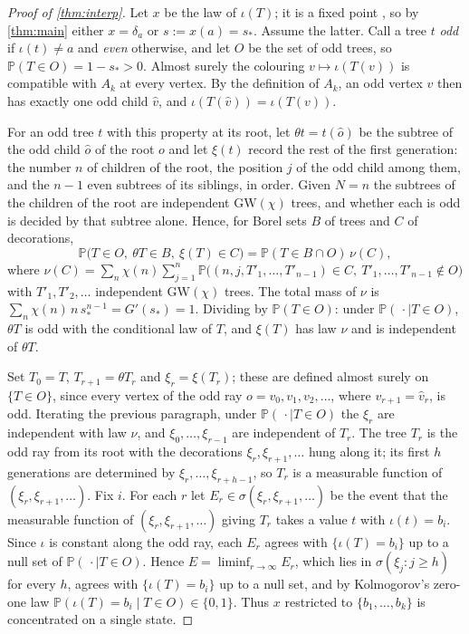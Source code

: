 \documentclass[11pt]{amsart}
\theoremstyle{remark}
\newcommand{\GW}{\mathrm{GW}}
\begin{document}
\begin{proof}[Proof of \cref{thm:interp}]
Let $x$ be the law of $\iota(T)$; it is a fixed point \cite[Section~1.5]{JPS}, so by \cref{thm:main} either $x=\delta_a$ or $s:=x(a)=s_*$. Assume the latter. Call a tree $t$ \emph{odd} if $\iota(t)\ne a$ and \emph{even} otherwise, and let $O$ be the set of odd trees, so $\mathbb P(T\in O)=1-s_*>0$. Almost surely the colouring $v\mapsto\iota(T(v))$ is compatible with $A_k$ at every vertex. By the definition of $A_k$, an odd vertex $v$ then has exactly one odd child $\hat v$, and $\iota(T(\hat v))=\iota(T(v))$.

For an odd tree $t$ with this property at its root, let $\theta t=t(\hat o)$ be the subtree of the odd child $\hat o$ of the root $o$ and let $\xi(t)$ record the rest of the first generation: the number $n$ of children of the root, the position $j$ of the odd child among them, and the $n-1$ even subtrees of its siblings, in order. Given $N=n$ the subtrees of the children of the root are independent $\GW(\chi)$ trees, and whether each is odd is decided by that subtree alone. Hence, for Borel sets $B$ of trees and $C$ of decorations,
\[
\mathbb P\bigl(T\in O,\ \theta T\in B,\ \xi(T)\in C\bigr)=\mathbb P(T\in B\cap O)\,\nu(C),
\]
where $\nu(C)=\sum_n\chi(n)\sum_{j=1}^{n}\mathbb P\bigl((n,j,T'_1,\dots,T'_{n-1})\in C,\ T'_1,\dots,T'_{n-1}\notin O\bigr)$ with $T'_1,T'_2,\dots$ independent $\GW(\chi)$ trees. The total mass of $\nu$ is $\sum_n\chi(n)\,n\,s_*^{n-1}=G'(s_*)=1$. Dividing by $\mathbb P(T\in O)$: under $\mathbb P(\,\cdot\mid T\in O)$, $\theta T$ is odd with the conditional law of $T$, and $\xi(T)$ has law $\nu$ and is independent of $\theta T$.

Set $T_0=T$, $T_{r+1}=\theta T_r$ and $\xi_r=\xi(T_r)$; these are defined almost surely on $\{T\in O\}$, since every vertex of the odd ray $o=v_0,v_1,v_2,\dots$, where $v_{r+1}=\hat v_r$, is odd. Iterating the previous paragraph, under $\mathbb P(\,\cdot\mid T\in O)$ the $\xi_r$ are independent with law $\nu$, and $\xi_0,\dots,\xi_{r-1}$ are independent of $T_r$. The tree $T_r$ is the odd ray from its root with the decorations $\xi_r,\xi_{r+1},\dots$ hung along it; its first $h$ generations are determined by $\xi_r,\dots,\xi_{r+h-1}$, so $T_r$ is a measurable function of $(\xi_r,\xi_{r+1},\dots)$. Fix $i$. For each $r$ let $E_r\in\sigma(\xi_r,\xi_{r+1},\dots)$ be the event that the measurable function of $(\xi_r,\xi_{r+1},\dots)$ giving $T_r$ takes a value $t$ with $\iota(t)=b_i$. Since $\iota$ is constant along the odd ray, each $E_r$ agrees with $\{\iota(T)=b_i\}$ up to a null set of $\mathbb P(\,\cdot\mid T\in O)$. Hence $E=\liminf_{r\to\infty}E_r$, which lies in $\sigma(\xi_j:j\ge h)$ for every $h$, agrees with $\{\iota(T)=b_i\}$ up to a null set, and by Kolmogorov's zero-one law $\mathbb P(\iota(T)=b_i\mid T\in O)\in\{0,1\}$. Thus $x$ restricted to $\{b_1,\dots,b_k\}$ is concentrated on a single state.
\end{proof}
\end{document}
